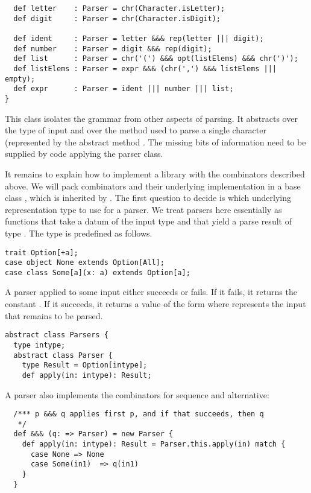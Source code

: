 {\begin{lstlisting}
  def letter    : Parser = chr(Character.isLetter);
  def digit     : Parser = chr(Character.isDigit);

  def ident     : Parser = letter &&& rep(letter ||| digit);
  def number    : Parser = digit &&& rep(digit);
  def list      : Parser = chr('(') &&& opt(listElems) &&& chr(')');
  def listElems : Parser = expr &&& (chr(',') &&& listElems ||| empty);
  def expr      : Parser = ident ||| number ||| list;
}
\end{lstlisting}
This class isolates the grammar from other aspects of parsing. It
abstracts over the type of input 
and over the method used to parse a single character
(represented by the abstract method . The missing bits of information need to be supplied by code
applying the parser class.

It remains to explain how to implement a library with the combinators
described above. We will pack combinators and their underlying
implementation in a base class , which is inherited by
.  The first question to decide is which underlying
representation type to use for a parser. We treat parsers here
essentially as functions that take a datum of the input type
 and that yield a parse result of type
.  The  type is predefined as
follows.
\begin{lstlisting}
trait Option[+a];
case object None extends Option[All];
case class Some[a](x: a) extends Option[a];
\end{lstlisting}
A parser applied to some input either succeeds or fails. If it fails,
it returns the constant . If it succeeds, it returns a
value of the form  where  represents the
input that remains to be parsed.
\begin{lstlisting}
abstract class Parsers {
  type intype;
  abstract class Parser {
    type Result = Option[intype];  
    def apply(in: intype): Result;
\end{lstlisting}
A parser also implements the combinators
for sequence and alternative:
\begin{lstlisting}
  /*** p &&& q applies first p, and if that succeeds, then q
   */
  def &&& (q: => Parser) = new Parser {
    def apply(in: intype): Result = Parser.this.apply(in) match {
      case None => None
      case Some(in1)  => q(in1)
    }
  }


\end{lstlisting}}
